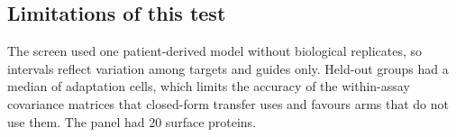 \subsection*{Limitations of this test}
The screen used one patient-derived model without biological replicates, so
intervals reflect variation among targets and guides only. Held-out groups had a
median of \PtAdaptMedian{} adaptation cells, which limits the accuracy of the
within-assay covariance matrices that closed-form transfer uses and favours
arms that do not use them. The panel had 20 surface proteins.
